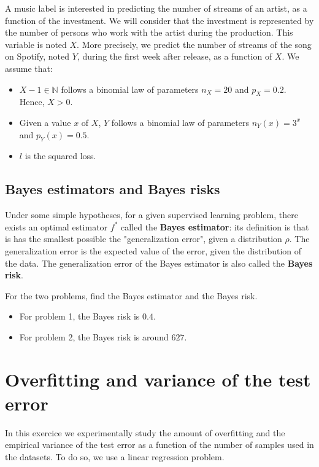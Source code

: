 \documentclass[
10pt, %
a4paper, %
oneside, %
headinclude,footinclude, %
BCOR5mm, %
]{scrartcl}
\begin{document}
A music label is interested in predicting the number of streams of an artist, as a function of the investment. We will consider that the investment is represented by the number of persons who work with the artist during the production. This variable is noted $X$. More precisely, we predict the number of streams of the song on Spotify, noted $Y$, during the first week after release, as a function of $X$. We assume that:
\begin{itemize}
    \item $X-1\in \mathbb{N}$ follows a binomial law of parameters $n_X=20$ and $p_X=0.2$. Hence, $X>0$.
    \item Given a value $x$ of $X$, $Y$ follows a binomial law of parameters $n_Y(x)=3^x$ and $p_Y(x) = 0.5$.
    \item $l$ is the squared loss.
\end{itemize}

\subsection{Bayes estimators and Bayes risks}%
\label{ssub:Bayes estimator}

Under some simple hypotheses, for a given supervised learning problem, there exists an optimal estimator $f^*$ called the \textbf{Bayes estimator}: its definition is that is has the smallest possible the "generalization error", given a distribution $\rho$. The generalization error is the expected value of the error, given the distribution of the data. The generalization error of the Bayes estimator is also called the \textbf{Bayes risk}.


{
\color{Purple}For the two problems, find the Bayes estimator and the Bayes risk.
}


\begin{itemize}
	\item For problem 1, the Bayes risk is $0.4$.
	\item For problem 2, the Bayes risk is around $627$.
\end{itemize}

\pagebreak

\section{\large\color{Blue}Overfitting and variance of the test error}
\label{sec:overfitting}

In this exercice we experimentally study the amount of overfitting and the empirical variance of the test error as a function of the number of samples used in the datasets. To do so, we use a linear regression problem.
\end{document}
